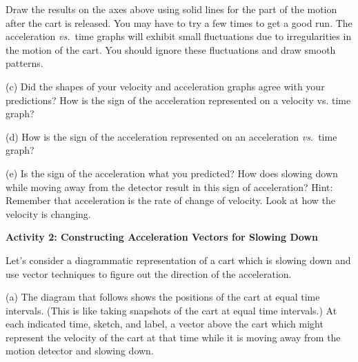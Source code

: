 Draw the results on the axes above using solid lines for the part of the motion
after the cart is released. You may have to try a few times to get a good run.  The acceleration \textit{vs.}~time graphs will exhibit small fluctuations due to irregularities in the motion of the cart. You should ignore these fluctuations and draw smooth patterns.

(c) Did the shapes of your velocity and acceleration graphs agree with your
predictions? How is the sign of the acceleration represented on a velocity vs.
time graph? 
\answerspace{15mm}

(d) How is the sign of the acceleration represented on an acceleration \textit{vs.}~time
graph? 
\answerspace{15mm}

\pagebreak[3]
(e) Is the sign of the acceleration what you predicted? How does slowing down
while moving away from the detector result in this sign of acceleration? Hint:
Remember that acceleration is the rate of change of velocity. Look at how the
velocity is changing.
\answerspace{20mm}

\textbf{Activity 2: Constructing Acceleration Vectors for Slowing Down}

Let's consider a diagrammatic representation of a cart which is slowing down
and use vector techniques to figure out the direction of the acceleration.


(a) The diagram that follows shows the positions of the cart at equal time intervals.
(This is like taking snapshots of the cart at equal time intervals.) At each
indicated time, sketch, and label, a vector above the cart which might represent the velocity
of the cart at that time while it is moving away from the motion detector and
slowing down.

